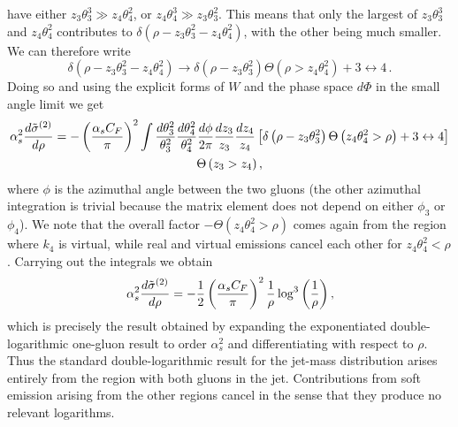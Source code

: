 have either $z_3\theta_3^3\gg z_4\theta_4^2$, or $z_4\theta_4^3\gg
z_3\theta_3^2$.
%
This means that only the largest of $z_3\theta_3^3$ and
$z_4\theta_4^2$ contributes to $\delta\left(\rho-z_3 \theta_3^2-z_4
  \theta_4^2 \right)$, with the other being much smaller. We can
therefore write
\begin{equation}\label{eq:delta-2em-simplifacation-LL}
  \delta\left(\rho-z_3 \theta_3^2-z_4 \theta_4^2\right) \to
  \delta\left(\rho-z_3 \theta_3^2\right)\Theta\left(\rho>z_4
    \theta_4^2 \right)+3\leftrightarrow 4\,.
\end{equation} 
Doing so and using the explicit forms of $W$ and the phase space $d \Phi$ in the small angle limit we get 
\begin{multline}
\alpha_s^2 \frac{d \tilde \sigma^{(2)}}{{d}\rho} = - \left ( \frac{\alpha_sC_F}{\pi} \right)^2 
\int \frac{d\theta_3^2}{\theta_3^2}\frac{d\theta_4^2}{\theta_4^2} 
\frac{d\phi}{2\pi} \frac{dz_3}{z_3} \frac{dz_4}{z_4} \left[ \delta\left(\rho-z_3 \theta_3^2\right)\Theta\left(z_4 \theta_4^2 >\rho \right)+3 \leftrightarrow 4 \right]\\ \Theta \left(z_3>z_4\right),
\end{multline}
where $\phi$ is the azimuthal angle between the two gluons (the other
azimuthal integration is trivial because the matrix element does not
depend on either $\phi_3$ or $\phi_4$).
%
We note that the overall factor
$-\Theta\left(z_4 \theta_4^2 >\rho \right)$ comes again from the
region where $k_4$ is virtual, while real and virtual emissions cancel
each other for $z_4 \theta_4^2 <\rho$.
%
Carrying out the integrals we obtain
\begin{equation}\label{eq:LL-result-alphas2}
\alpha_s^2 \frac{d \tilde \sigma^{(2)}}{{d}\rho}  = -\frac{1}{2} \left(\frac{\alpha_sC_F}{\pi} \right)^2 \frac{1}{\rho} \log^3 \left (\frac{1}{\rho} \right),
\end{equation}
which is precisely the result obtained by expanding the exponentiated double-logarithmic one-gluon result to order $\alpha_s^2$ and differentiating with respect to $\rho$.
Thus the standard double-logarithmic result for the jet-mass
distribution arises entirely from the region with both gluons in the
jet. Contributions from soft emission arising from the other regions
cancel in the sense that they produce no relevant logarithms.


